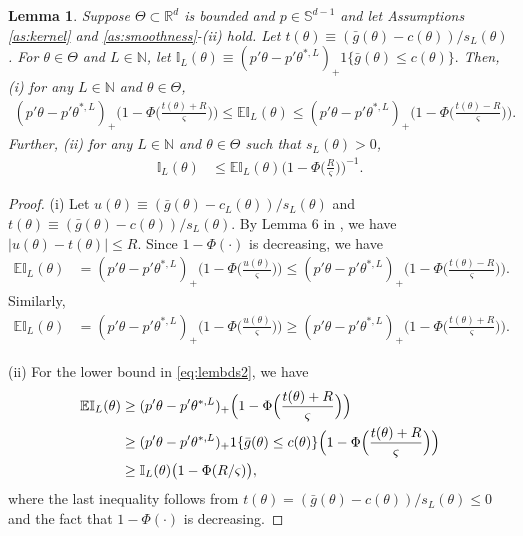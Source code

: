 \documentclass[letterpaper,11pt]{article}
\theoremstyle{myplain}
\newtheorem{lemma}{Lemma}[section]
\theoremstyle{mydefinition}
\theoremstyle{myremark}
\renewcommand{\cite}{\citet}
\newcommand{\EI}{\mathbb{EI}}
\numberwithin{equation}{section}
\numberwithin{figure}{section}
\begin{document}
\begin{appendix}
\begin{lemma}\label{lem:bds}Suppose $\Theta\subset\mathbb R^d$ is bounded and $p\in \mathbb S^{d-1}$  and let Assumptions \ref{as:kernel} and \ref{as:smoothness}-(ii) hold.
Let $t(\theta)\equiv (\bar g(\theta)-c(\theta))/s_L(\theta)$. For $\theta\in\Theta$ and $L\in\mathbb N$, let $\mathbb{I}_L(\theta)\equiv (p'\theta-p'\theta^{*,L})_+1\{\bar g(\theta)\le c(\theta)\}.$
 Then, (i) for any $L\in\mathbb N$ and $\theta\in\Theta$,
\begin{align}
(p'\theta-p'\theta^{*,L})_+\Big(1-\Phi\Big(\frac{t(\theta)+R}{\varsigma}\Big)\Big)\le \EI_L(\theta)\le (p'\theta-p'\theta^{*,L})_+\Big(1-\Phi\Big(\frac{t(\theta)-R}{\varsigma}\Big)\Big).
\end{align}
 Further, (ii) for any $L\in\mathbb N$ and $\theta\in\Theta$ such that $s_L(\theta)>0$,
\begin{align}
\mathbb{I}_L(\theta)	&\le \EI_L(\theta)\Big(1-\Phi\Big(\frac{R}{\varsigma}\Big)\Big)^{-1}.\label{eq:lembds2}
\end{align}
\end{lemma}



\begin{proof}
(i)	Let $u(\theta)\equiv (\bar g(\theta)-c_L(\theta))/s_L(\theta)$ and $t(\theta)\equiv (\bar g(\theta)-c(\theta))/s_L(\theta)$.
	By Lemma 6 in \cite{Bull_Convergence_2011}, we have $|u(\theta)-t(\theta)|\le R.$ Since $1-\Phi(\cdot)$ is decreasing, we have
	\begin{align}
		\EI_L(\theta)&=(p'\theta-p'\theta^{*,L})_+\Big(1-\Phi\Big(\frac{u(\theta)}{\varsigma }\Big)\Big)
		\le (p'\theta-p'\theta^{*,L})_+\Big(1-\Phi\Big(\frac{t(\theta)-R}{\varsigma}\Big)\Big).
		\end{align}
Similarly,
\begin{align}
		\EI_L(\theta)&=(p'\theta-p'\theta^{*,L})_+\Big(1-\Phi\Big(\frac{u(\theta)}{\varsigma }\Big)\Big)
		\ge (p'\theta-p'\theta^{*,L})_+\Big(1-\Phi\Big(\frac{t(\theta)+R}{\varsigma}\Big)\Big).
\end{align}

\noindent
(ii) For the lower bound in \eqref{eq:lembds2}, we have
\begin{align}
	\EI_L(\theta)&
	\ge (p'\theta-p'\theta^{*,L})_+\Big(1-\Phi\Big(\frac{t(\theta)+R}{\varsigma}\Big)\Big)\notag\\
	&\ge (p'\theta-p'\theta^{*,L})_+1\{\bar g(\theta)\le c(\theta)\}\Big(1-\Phi\Big(\frac{t(\theta)+R}{\varsigma}\Big)\Big)\notag\\
	&\ge \mathbb{I}_L(\theta)\bigl(1-\Phi(R/\varsigma)\bigr),
\end{align}
where the last inequality follows from $t(\theta)=(\bar g(\theta)-c(\theta))/s_L(\theta)\le 0$ and the fact that $1-\Phi(\cdot)$ is decreasing.
\end{proof}





\end{appendix}
\end{document}
